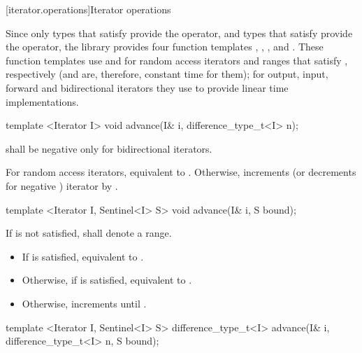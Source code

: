 [iterator.operations]{Iterator operations}

\pnum
Since only types that satisfy
 provide the \tcode{+} operator, and
types that satisfy  provide the \tcode{-}
operator, the library provides four function templates
, , , and .
These
function templates
use
\tcode{+}
and
\tcode{-}
for random access iterators and ranges that satisfy , respectively (and are, therefore, constant
time for them); for output, input, forward and bidirectional iterators they use
\tcode{++}
to provide linear time
implementations.

%
\begin{itemdecl}
template <Iterator I>
  void advance(I& i, difference_type_t<I> n);
\end{itemdecl}

\begin{itemdescr}
\pnum
\requires
{}
shall be negative only for bidirectional iterators.

\pnum
\effects
For random access iterators, equivalent to .
Otherwise, increments (or decrements for negative
)
iterator
by
.
\end{itemdescr}

\begin{itemdecl}
template <Iterator I, Sentinel<I> S>
  void advance(I& i, S bound);
\end{itemdecl}

\begin{itemdescr}
\pnum
\requires
If
 is not satisfied, 
shall denote a range.

\pnum
\effects
\begin{itemize}
\item If  is satisfied,
      equivalent to .

\item Otherwise, if
       is satisfied, equivalent to .

\item Otherwise, increments  until .
\end{itemize}
\end{itemdescr}

\begin{itemdecl}
template <Iterator I, Sentinel<I> S>
  difference_type_t<I> advance(I& i, difference_type_t<I> n, S bound);
\end{itemdecl}

